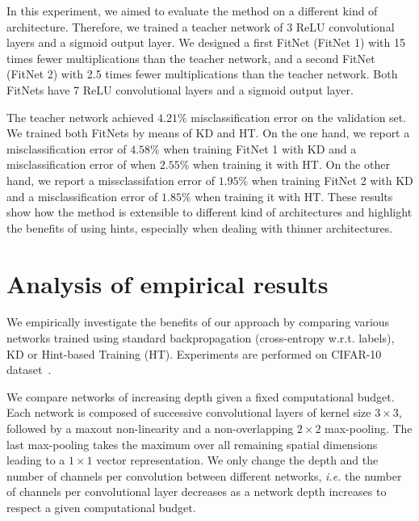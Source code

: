 \documentclass{article} %
\begin{document}
In this experiment, we aimed to evaluate the method on a different kind of architecture. Therefore, we trained a teacher network of 3 ReLU convolutional layers and a sigmoid output layer. We designed a first FitNet (FitNet 1) with 15 times fewer multiplications than the teacher network, and a second FitNet (FitNet 2) with 2.5 times fewer multiplications than the teacher network. Both FitNets have 7 ReLU convolutional layers and a sigmoid output layer.

The teacher network achieved $4.21\%$ misclassification error on the validation set. We trained both FitNets by means of KD and HT. On the one hand, we report a misclassification error of $4.58\%$ when training FitNet 1 with KD and a misclassification error of when $2.55\%$ when training it with HT. On the other hand, we report a missclassifation error of $1.95\%$ when training FitNet 2 with KD and a misclassification error of $1.85\%$ when training it with HT. These results show how the method is extensible to different kind of architectures and highlight the benefits of using hints, especially when dealing with thinner architectures.

\vspace*{-1mm}
\section{Analysis of empirical results}
\label{sec:empres}
\vspace*{-1mm}

We empirically investigate the benefits of our
approach by comparing various networks trained using
standard backpropagation (cross-entropy w.r.t. labels), KD
or Hint-based Training (HT). Experiments are performed on CIFAR-10
dataset~\citep{Krizhevsky09}.

We compare networks of increasing depth given a fixed computational
budget. Each network is composed of successive convolutional layers of kernel
size $3 \times 3$, followed by a maxout non-linearity and a non-overlapping $2
\times 2$ max-pooling. The last max-pooling takes the maximum over all remaining
spatial dimensions leading to a $1 \times 1$ vector representation.  We only
change the depth and the number of channels per convolution between different
networks, \textit{i.e.} the number of channels per convolutional layer
decreases as a network depth increases to respect a given computational budget. 
\end{document}
